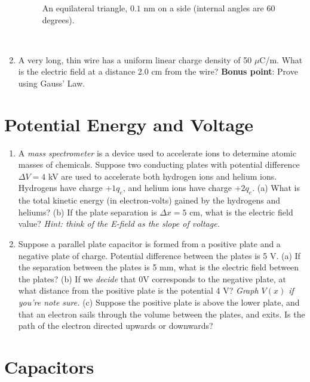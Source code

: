 \documentclass[10pt]{article}
\begin{document}
\begin{enumerate}
\begin{figure}[ht]
\caption{\label{fig:tri} An equilateral triangle, $0.1$ nm on a side (internal angles are 60 degrees).}
\end{figure} \\ \vspace{1cm}
\item A very long, thin wire has a uniform linear charge density of 50 $\mu$C/m.  What is the electric field at a distance 2.0 cm from the wire?  \textbf{Bonus point}: Prove using Gauss' Law.  \\ \vspace{2cm}
\end{enumerate}

\section{Potential Energy and Voltage}

\begin{enumerate}
\item A \textit{mass spectrometer} is a device used to accelerate ions to determine atomic masses of chemicals.  Suppose two conducting plates with potential difference $\Delta V = 4$ kV are used to accelerate both hydrogen ions and helium ions.  Hydrogens have charge $+1 q_e$, and helium ions have charge $+2 q_e$.  (a) What is the total kinetic energy (in electron-volts) gained by the hydrogens and heliums? (b) If the plate separation is $\Delta x = 5$ cm, what is the electric field value?  \textit{Hint: think of the E-field as the slope of voltage.} \\ \vspace{3cm}
\item Suppose a parallel plate capacitor is formed from a positive plate and a negative plate of charge.  Potential difference between the plates is 5 V.  (a) If the separation between the plates is 5 mm, what is the electric field between the plates? (b) If we \textit{decide} that 0V corresponds to the negative plate, at what distance from the positive plate is the potential 4 V?  \textit{Graph $V(x)$ if you're note sure.} (c) Suppose the positive plate is above the lower plate, and that an electron sails through the volume between the plates, and exits.  Is the path of the electron directed upwards or downwards? \\ \vspace{3.5cm}
\end{enumerate}

\section{Capacitors}
\end{document}
